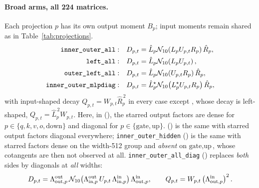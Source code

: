 \paragraph{Broad arms, all 224 matrices.}
Each projection $p$ has its own output moment $B_p$; input moments remain
shared as in Table~\ref{tab:projections}.
\begin{align*}
\texttt{inner\_outer\_all}{}:\quad & D_{p,t}=\hat L_p\mathcal{N}_{10}\!\left(L_pU_{p,t}R_p\right)\hat R_p,\\
\texttt{left\_all}{}:\quad & D_{p,t}=\hat L_p\mathcal{N}_{10}\!\left(L_pU_{p,t}\right),\\
\texttt{outer\_left\_all}:\quad & D_{p,t}=\hat L_p\mathcal{N}_{10}\!\left(U_{p,t}R_p\right)\hat R_p,\\
\texttt{inner\_outer\_mlpdiag}{}:\quad & D_{p,t}=\hat L^{\star}_p\mathcal{N}_{10}\!\left(L^{\star}_pU_{p,t}R_p\right)\hat R_p,
\end{align*}
with input-shaped decay $Q_{p,t}=W_{p,t}\hat R_p^{\,2}$ in every case except
\leftall{}, whose decay is left-shaped, $Q_{p,t}=\hat L_p^{\,2}W_{p,t}$.
Here, in \mlpdiag{} (), the starred output factors are dense for
$p\in\{q,k,v,o,\text{down}\}$ and diagonal for $p\in\{\text{gate},\text{up}\}$.
\alldiag{} () is the same with starred output factors diagonal
everywhere; \texttt{inner\_outer\_hidden} () is the same with
starred factors dense on the width-512 group and \emph{absent} on
$\text{gate},\text{up}$, whose cotangents are then not observed at all.
\texttt{inner\_outer\_all\_diag} () replaces \emph{both}
sides by diagonals at \emph{all} widths:
\[
D_{p,t}=\Lambda^{\text{out}}_{\text{out},p}\,
\mathcal{N}_{10}\!\left(\Lambda^{\text{out}}_{\text{in},p}\,U_{p,t}\,
\Lambda^{\text{in}}_{\text{in},p}\right)\Lambda^{\text{in}}_{\text{out},p},
\qquad
Q_{p,t}=W_{p,t}\left(\Lambda^{\text{in}}_{\text{out},p}\right)^{2}.
\]

